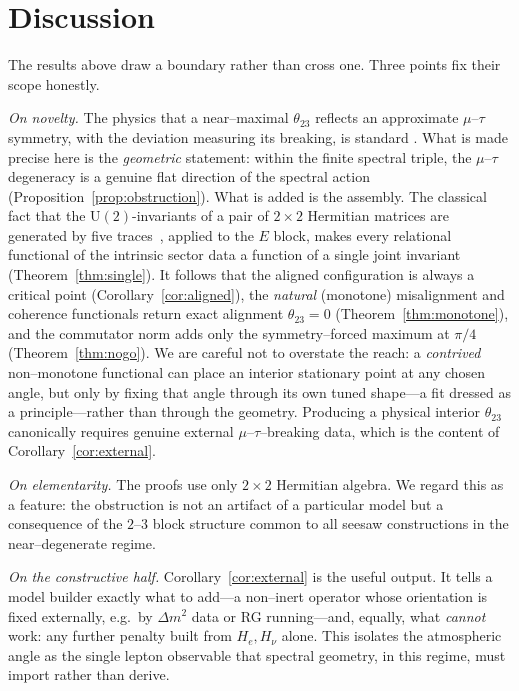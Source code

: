 \documentclass[11pt,a4paper]{article}
\theoremstyle{definition}
\newcommand{\He}{H_e}
\newcommand{\Hnu}{H_\nu}
\begin{document}



\section{Discussion}\label{sec:discussion}

The results above draw a boundary rather than cross one. Three points fix their
scope honestly.

\emph{On novelty.} The physics that a near--maximal $\theta_{23}$ reflects an
approximate $\mu$--$\tau$ symmetry, with the deviation measuring its breaking, is
standard \cite{harrison2002,xingzhao2016,kingluhn2013}. What is made precise here
is the \emph{geometric} statement: within the finite spectral triple, the
$\mu$--$\tau$ degeneracy is a genuine flat direction of the spectral action
(Proposition~\ref{prop:obstruction}). What is added is the assembly. The classical fact that the
$\mathrm U(2)$-invariants of a pair of $2\times2$ Hermitian matrices are generated by five
traces~\cite{sibirskii1968,drensky2005}, applied to the $E$ block, makes every relational
functional of the intrinsic sector data a function of a single joint invariant
(Theorem~\ref{thm:single}). It follows that the aligned configuration is always a critical
point (Corollary~\ref{cor:aligned}), the \emph{natural} (monotone) misalignment and
coherence functionals return exact alignment $\theta_{23}=0$
(Theorem~\ref{thm:monotone}), and the commutator norm adds only the
symmetry--forced maximum at $\pi/4$ (Theorem~\ref{thm:nogo}). We are careful not to
overstate the reach: a \emph{contrived} non--monotone functional can place an
interior stationary point at any chosen angle, but only by fixing that angle
through its own tuned shape---a fit dressed as a principle---rather than through the
geometry. Producing a physical interior $\theta_{23}$ canonically requires genuine
external $\mu$--$\tau$--breaking data, which is the content of
Corollary~\ref{cor:external}.

\emph{On elementarity.} The proofs use only $2\times2$ Hermitian algebra. We regard
this as a feature: the obstruction is not an artifact of a particular model but a
consequence of the $2$--$3$ block structure common to all seesaw constructions in
the near--degenerate regime.

\emph{On the constructive half.} Corollary~\ref{cor:external} is the useful
output. It tells a model builder exactly what to add---a non--inert operator whose
orientation is fixed externally, e.g.\ by $\Delta m^2$ data or RG running---and,
equally, what \emph{cannot} work: any further penalty built from $\He,\Hnu$ alone.
This isolates the atmospheric angle as the single lepton observable that spectral
geometry, in this regime, must import rather than derive.
\end{document}
